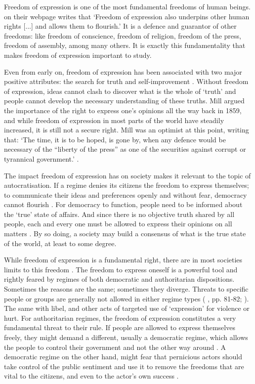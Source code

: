 Freedom of expression is one of the most fundamental freedoms of human beings. \citet{amnesty_international_freedom_2023} on their webpage writes that `Freedom of expression also underpins other human rights [...] and allows them to flourish.'  It is a defence and guarantor of other freedoms: like freedom of conscience, freedom of religion, freedom of the press, freedom of assembly, among many others. It is exactly this fundamentality that makes freedom of expression important to study.

Even from early on, freedom of expression has been associated with two major positive attributes: the search for truth and self-improvement \citep[pp. 25-80]{mill_liberty_2010}. Without freedom of expression, ideas cannot clash to discover what is the whole of `truth' and people cannot develop the necessary understanding of these truths. Mill argued the importance of the right to express one's opinions all the way back in 1859, and while freedom of expression in most parts of the world have steadily increased, it is still not a secure right. Mill was an optimist at this point, writing that: `The time, it is to be hoped, is gone by, when any defence would be necessary of the ``liberty of the press'' as one of the securities against corrupt or tyrannical government.' \citep[p. 25]{mill_liberty_2010}.

The impact freedom of expression has on society makes it relevant to the topic of autocratisation. If a regime denies its citizens the freedom to express themselves; to communicate their ideas and preferences openly and without fear, democracy cannot flourish \citep{bhagwat_freedom_2021}. For democracy to function, people need to be informed about the `true' state of affairs. And since there is no objective truth shared by all people, each and every one must be allowed to express their opinions on all matters \citep{mill_liberty_2010}. By so doing, a society may build a consensus of what is the true state of the world, at least to some degree. 

While freedom of expression is a fundamental right, there are in most societies limits to this freedom \citep{bonotti_freedom_2021}. The freedom to express oneself is a powerful tool and rightly feared by regimes of both democratic and authoritarian dispositions. Sometimes the reasons are the same; sometimes they diverge. Threats to specific people or groups are generally not allowed in either regime types (\citeauthor{mill_liberty_2010} \citeyear{mill_liberty_2010}, pp. 81-82; \citeauthor{bonotti_freedom_2021} \citeyear{bonotti_freedom_2021}). The same with libel, and other acts of targeted use of `expression' for violence or hurt. For authoritarian regimes, the freedom of expression constitutes a very fundamental threat to their rule. If people are allowed to express themselves freely, they might demand a different, usually a democratic regime, which allows the people to control their government and not the other way around \citep[p. 85-86]{bhagwat_freedom_2021}. A democratic regime on the other hand, might fear that pernicious actors should take control of the public sentiment and use it to remove the freedoms that are vital to the citizens, and even to the actor's own success \citep[p. 103]{bhagwat_freedom_2021}.

